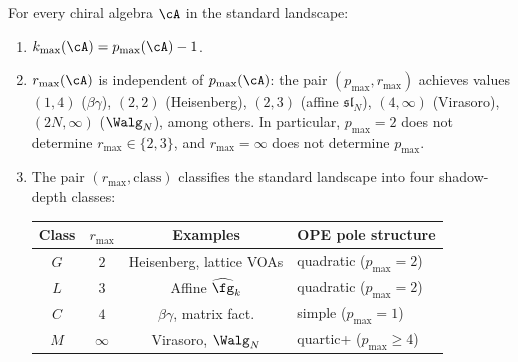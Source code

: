 \begin{proposition}
\label{prop:three-invariants-relations}
\ClaimStatusProvedHere
For every chiral algebra $\cA$ in the standard landscape:
\begin{enumerate}[label=\textup{(\roman*)}]
\item $k_{\max}(\cA) = p_{\max}(\cA) - 1$.
\item $r_{\max}(\cA)$ is independent of $p_{\max}(\cA)$: the pair
 $(p_{\max}, r_{\max})$ achieves values
 $(1, 4)$ \textup{(}$\beta\gamma$\textup{)},
 $(2, 2)$ \textup{(}Heisenberg\textup{)},
 $(2, 3)$ \textup{(}affine $\mathfrak{sl}_N$\textup{)},
 $(4, \infty)$ \textup{(}Virasoro\textup{)},
 $(2N, \infty)$ \textup{(}$\Walg_N$\textup{)},
 among others. In particular, $p_{\max} = 2$ does not determine
 $r_{\max}\in\{2, 3\}$, and $r_{\max} = \infty$ does not determine
 $p_{\max}$.
\item The pair $(r_{\max}, \mathrm{class})$ classifies the standard
 landscape into four shadow-depth classes:
 \begin{center}
 \renewcommand{\arraystretch}{1.2}
 \begin{tabular}{cccl}
 \textbf{Class} & $r_{\max}$ & \textbf{Examples} & \textbf{OPE pole structure} \\
 \hline
 $G$ & $2$ & Heisenberg, lattice VOAs & quadratic ($p_{\max}=2$) \\
 $L$ & $3$ & Affine $\widehat{\fg}_k$ & quadratic ($p_{\max}=2$) \\
 $C$ & $4$ & $\beta\gamma$, matrix fact. & simple ($p_{\max}=1$) \\
 $M$ & $\infty$ & Virasoro, $\Walg_N$ & quartic+ ($p_{\max}\geq 4$)
 \end{tabular}
 \end{center}
\end{enumerate}
\end{proposition}

